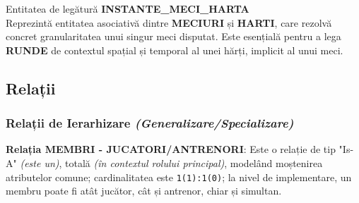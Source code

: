 \documentclass[11pt, a4paper]{article}
\begin{document}
Entitatea de legătură \textbf{INSTANTE\_MECI\_HARTA} \\
Reprezintă entitatea asociativă dintre \textbf{MECIURI} și \textbf{HARTI}, care rezolvă concret granularitatea unui singur meci disputat. Este esențială pentru a lega \textbf{RUNDE} de contextul spațial și temporal al unei hărți, implicit al unui meci.

\subsection{Relații}

\subsubsection{Relații de Ierarhizare \textit{(Generalizare/Specializare)}}
\textbf{Relația MEMBRI - JUCATORI/ANTRENORI}: Este o relație de tip "Is-A" \textit{(este un)}, totală \textit{(în contextul rolului principal)}, modelând moștenirea atributelor comune; cardinalitatea este \texttt{1(1):1(0)}; la nivel de implementare, un membru poate fi atât jucător, cât și antrenor, chiar și simultan.
\end{document}
